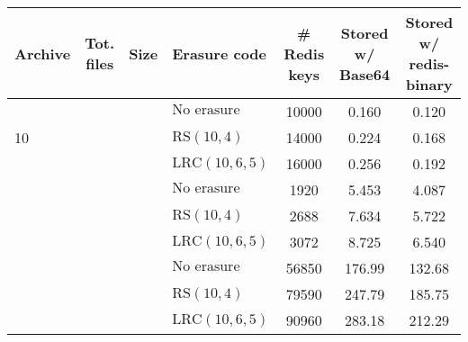 \begin{tabular}{
        l
        c
        c
        l
        S[table-format=5.0]
        S[table-format=3.3]
        S[table-format=3.3]
}
\toprule
Archive & Tot. files & Size & Erasure code & {\# Redis keys} & {Stored w/ Base64} & {Stored w/ redis-binary} \\

\midrule

 &  &  & $\text{No erasure coding}$ & 10000 & 0.160 & 0.120 \\
 & & & $\text{RS}\left(10,4\right)$ & 14000 & 0.224 & 0.168 \\
 & & & $\text{LRC}\left(10,6,5\right)$ & 16000 & 0.256 & 0.192 \\

\addlinespace
 &  &  & $\text{No erasure coding}$ & 1920 & 5.453 & 4.087 \\
 & & & $\text{RS}\left(10,4\right)$ & 2688 & 7.634 & 5.722 \\
 & & & $\text{LRC}\left(10,6,5\right)$ & 3072 & 8.725 & 6.540 \\

\addlinespace
 &  &  & $\text{No erasure coding}$ & 56850 & 176.99 & 132.68 \\
 & & & $\text{RS}\left(10,4\right)$ & 79590 & 247.79 & 185.75 \\
 & & & $\text{LRC}\left(10,6,5\right)$ & 90960 & 283.18 & 212.29 \\
\bottomrule
\end{tabular}
